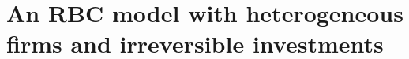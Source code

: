 \documentclass[12pt]{article}
\begin{document}
\small\normalsize%
\doublespace

\clearpage
\section*{An RBC model with heterogeneous firms and irreversible investments}

\end{document}
